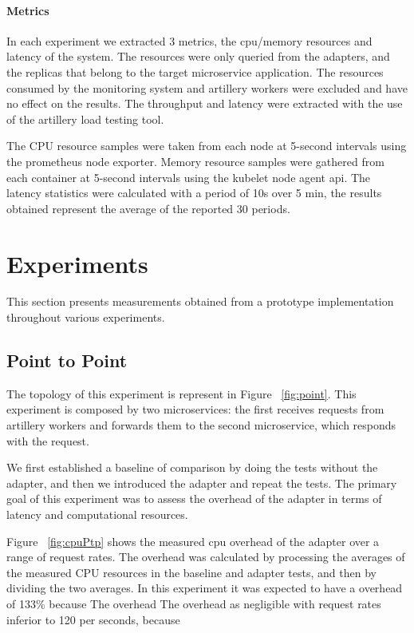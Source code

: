 \paragraph{Metrics}

In each experiment we extracted 3 metrics, the cpu/memory resources and latency of the system.
The resources were only queried from the adapters, and the replicas that belong to the target microservice application.
The resources consumed by the monitoring system and artillery workers were excluded and have no effect
on the results.
The throughput and latency were extracted with the use of the artillery load testing tool.

The CPU resource samples were taken from each node at 5-second intervals using the prometheus node exporter.
Memory resource samples were gathered from each container at 5-second intervals using the kubelet node agent api.
The latency statistics were calculated with a period of 10s over 5 min, the results obtained represent the
average of the reported 30 periods.

\section{Experiments} %
\label{sec:experiments}

This section presents measurements obtained from a prototype implementation throughout various experiments.


\subsection{Point to Point} %
\label{sec:point to point}

The topology of this experiment is represent in Figure ~\ref{fig:point}.
This experiment is composed by two microservices:
the first receives requests from artillery workers and forwards them to the second microservice, which responds with the request.

We first established a baseline of comparison
by doing the tests without the adapter, and then we introduced the adapter and repeat the tests.
The primary goal of this experiment was to assess the overhead of the adapter in terms of latency and computational resources.

Figure ~\ref{fig:cpuPtp} shows the measured cpu overhead of the adapter over a
range of request rates.
The overhead was calculated by processing the averages of the measured CPU resources in the baseline and adapter tests, and then by dividing the two averages.
In this experiment it was expected to have a overhead of 133\% because
The overhead
The overhead as negligible with request rates inferior to 120 per seconds, because


